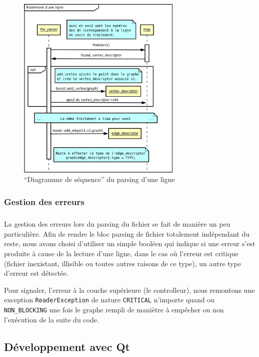 \begin{figure}[H]
\begin{center}
        \includegraphics[width=0.7\textwidth]{./schema/file_parser2.png}
\caption{``Diagramme de séquence'' du parsing d'une ligne }
\label{file_parser}
\end{center}
\end{figure}

\subsubsection{Gestion des erreurs}
\subparagraph{}
La gestion des erreurs lors du parsing du fichier se fait de manière un peu particulière. Afin de rendre le bloc parsing de fichier totalement indépendant du reste, nous avons choisi d'utiliser un simple booléen qui indique si une erreur s'est produite à cause de la lecture d'une ligne, dans le cas où l'erreur est critique (fichier inexistant, illisible ou toutes autres raisons de ce type), un autre type d'erreur est détectée. 

Pour signaler, l'erreur à la couche supérieure (le controlleur), nous remontons une exception \verb|ReaderException| de nature \verb|CRITICAL| n'importe quand ou \verb|NON_BLOCKING| une fois le graphe rempli de maniètre à empêcher ou non l'exécution de la suite du code.


\subsection{D\'eveloppement avec Qt}

